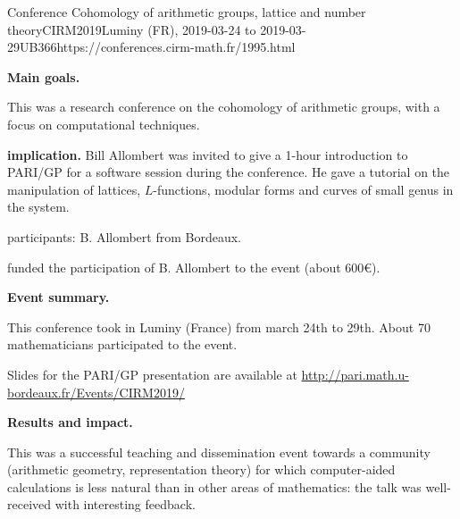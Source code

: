 \begin{event}{Conference Cohomology of arithmetic groups, lattice and number
  theory}{CIRM2019}{Luminy (FR),
  2019-03-24 to
  2019-03-29}{UB}{36}{6}{https://conferences.cirm-math.fr/1995.html}
  
\textbf{Main goals.}

  This was a research conference on the cohomology of arithmetic groups, with
a focus on computational techniques.

\textbf{\ODK implication.}
Bill Allombert was invited to give a 1-hour introduction to PARI/GP for a
software session during the conference. He gave a tutorial on the
manipulation of lattices, $L$-functions, modular forms and curves of small
genus in the system.

\ODK participants: B. Allombert from Bordeaux.

\ODK funded the participation of B. Allombert to the event (about 600\euro).

\textbf{Event summary.}

  This conference took in Luminy (France) from march 24th to 29th. About 70
mathematicians participated to the event.

Slides for the PARI/GP presentation are available at
\url{http://pari.math.u-bordeaux.fr/Events/CIRM2019/}

\textbf{Results and impact.}

This was a successful teaching and dissemination event towards a community
(arithmetic geometry, representation theory) for which computer-aided
calculations is less natural than in other areas of mathematics: the talk
was well-received with interesting feedback.
\end{event}
